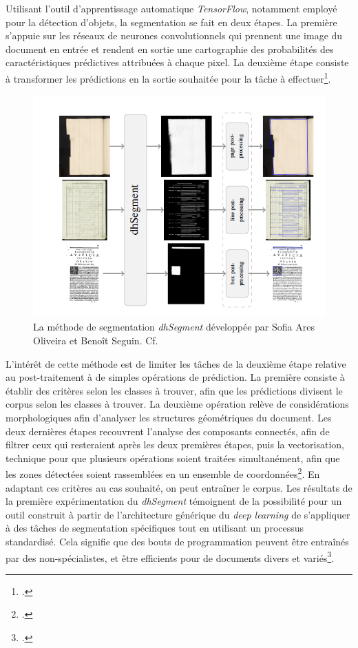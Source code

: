 \documentclass[a4paper,12pt,twoside]{book}
\begin{document}
    Utilisant l'outil d'apprentissage automatique \textit{TensorFlow}, notamment employé pour la détection d'objets, la segmentation se fait en deux étapes. La première s'appuie sur les réseaux de neurones convolutionnels qui prennent une image du document en entrée et rendent en sortie une cartographie des probabilités des caractéristiques prédictives attribuées à chaque pixel. La deuxième étape consiste à transformer les prédictions en la sortie souhaitée pour la tâche à effectuer\footcite[p. 1-2]{deep_learning_segmentation}. 
    
    \begin{figure}[!h]
    \centering
    \includegraphics[width=13cm]{img/ML/etapes_dhSegment.png}
    \caption{La méthode de segmentation \textit{dhSegment} développée par Sofia Ares Oliveira et Benoît Seguin. Cf. \cite[p. 2]{deep_learning_segmentation}}
    \end{figure}
    
    L'intérêt de cette méthode est de limiter les tâches de la deuxième étape relative au post-traitement à de simples opérations de prédiction. La première consiste à établir des critères selon les classes à trouver, afin que les prédictions divisent le corpus selon les classes à trouver. La deuxième opération relève de considérations morphologiques afin d'analyser les structures géométriques du document. Les deux dernières étapes recouvrent l'analyse des composants connectés, afin de filtrer ceux qui resteraient après les deux premières étapes, puis la vectorisation, technique pour que plusieurs opérations soient traitées simultanément, afin que les zones détectées soient rassemblées en un ensemble de coordonnées\footcite[p. 2]{deep_learning_segmentation}. En adaptant ces critères au cas souhaité, on peut entraîner le corpus. Les résultats de la première expérimentation du \textit{dhSegment} témoignent de la possibilité pour un outil construit à partir de l'architecture générique du \textit{deep learning} de s'appliquer à des tâches de segmentation spécifiques tout en utilisant un processus standardisé. Cela signifie que des bouts de programmation peuvent être entraînés par des non-spécialistes, et être efficients pour de documents divers et variés\footcite[p. 6]{deep_learning_segmentation}. 
    
\end{document}
